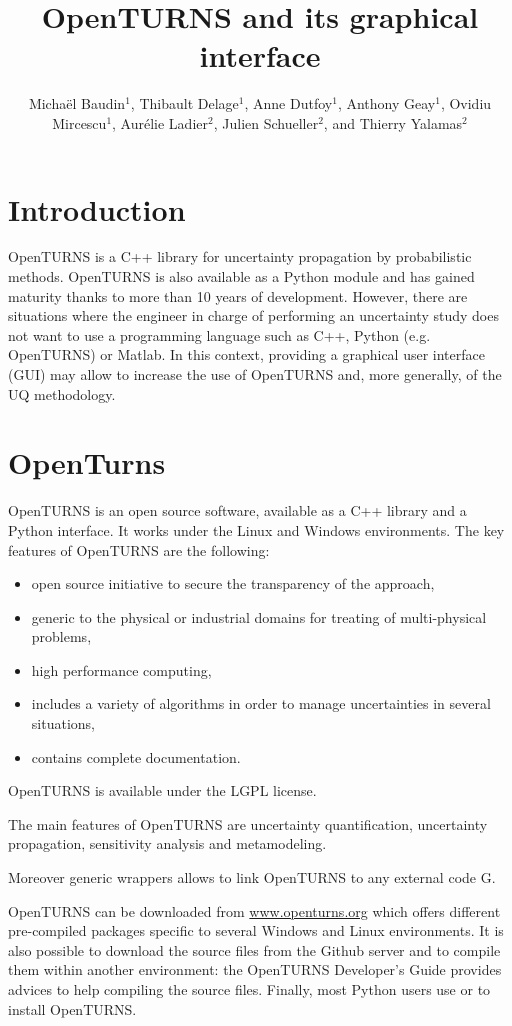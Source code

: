 \documentclass{uncecomp2019}
\title{OpenTURNS and its graphical interface}
\author{Michaël Baudin$^1$, Thibault Delage$^1$, Anne Dutfoy$^1$, 
Anthony Geay$^1$, Ovidiu Mircescu$^1$, 
Aurélie Ladier$^2$, Julien Schueller$^2$, and Thierry Yalamas$^2$}
\begin{document}

\section{Introduction}

OpenTURNS is a C++ library for uncertainty propagation by probabilistic 
methods. 
OpenTURNS is also available as a Python module and has gained maturity thanks to more 
than 10 years of development. 
However, there are situations where the engineer in charge of 
performing an uncertainty study does not want to use a programming language such as C++, Python 
(e.g. OpenTURNS) or Matlab. 
In this context, providing a graphical user interface (GUI) may allow 
to increase the use of OpenTURNS and, more generally, of the UQ methodology.



\section{OpenTurns}

OpenTURNS\cite{Baudin2016,OpenTURNSUncecomp17,OTurl} is an open source software, available as a 
C++ library and a Python interface. 
It works under the Linux and Windows environments. 
The key features of OpenTURNS are the following:
\begin{itemize}
\item open source initiative to secure the transparency of the approach,
\item generic to the physical or industrial domains for treating of multi-physical problems,
\item high performance computing,
\item includes a variety of algorithms in order to manage uncertainties in several situations,
\item contains complete documentation.
\end{itemize}
OpenTURNS is available under the LGPL license. 

The main features of OpenTURNS are uncertainty quantification, uncertainty propagation, 
sensitivity analysis and metamodeling. 

Moreover generic wrappers allows to link OpenTURNS to any external code G.

OpenTURNS can be downloaded from \url{www.openturns.org} which offers different 
pre-compiled packages specific to several Windows and Linux environments. 
It is also possible to download the source files from the Github server and to compile them within another 
environment: the OpenTURNS Developer's Guide provides advices to help compiling the source files. 
Finally, most Python users use  or  to install OpenTURNS.
\end{document}
